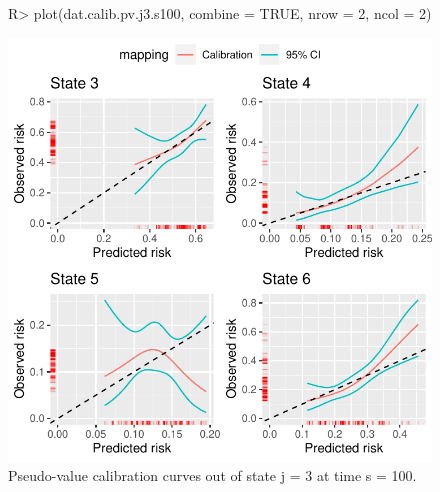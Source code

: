 \documentclass[article,shortnames]{jss}
\begin{document}
\begin{figure}
\centering
\begin{Schunk}
\begin{Sinput}
R> plot(dat.calib.pv.j3.s100, combine = TRUE, nrow = 2, ncol = 2)
\end{Sinput}
\end{Schunk}
\includegraphics{calibmsm-jss-TEST-016}
\caption{\label{fig:pvj3s100} Pseudo-value calibration curves out of state j =  3 at time s = 100.}
\end{figure}
\end{document}
